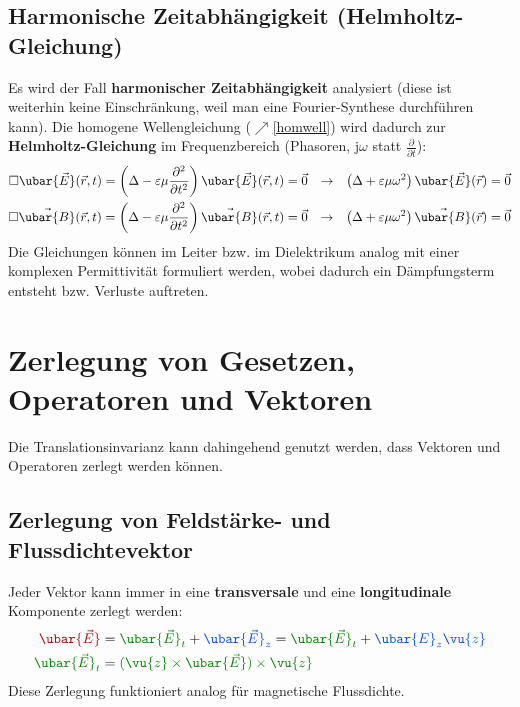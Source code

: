 \subsection{Harmonische Zeitabhängigkeit (Helmholtz-Gleichung)}
Es wird der Fall \textbf{harmonischer Zeitabhängigkeit} analysiert (diese ist weiterhin keine Einschränkung, weil man eine Fourier-Synthese durchführen kann). Die homogene Wellengleichung ($\nearrow$\ref{homwell}) wird dadurch zur \textbf{Helmholtz-Gleichung} im Frequenzbereich (Phasoren, \(\mathrm{j}\omega\) statt $\frac{\partial}{\partial t}$):
	\begin{align}
		\square \ubar{\vec{E}}(\vec{r} , t) = \left(\Delta - \varepsilon\mu\frac{\partial^2}{\partial t^2}\right) \ubar{\vec{E}} (\vec{r} , t) = \vec{0} &  & \rightarrow &  & \left(\Delta + \varepsilon\mu\omega^2\right) \ubar{\vec{E}}(\vec{r} ) =\vec{0} \label{helmholtze} \\
		\square \vec{\ubar{B}}(\vec{r} , t) = \left(\Delta - \varepsilon\mu\frac{\partial^2}{\partial t^2}\right) \vec{\ubar{B}} (\vec{r} , t) = \vec{0} &  & \rightarrow &  & \left(\Delta + \varepsilon\mu\omega^2\right) \vec{\ubar{B}}(\vec{r} ) =\vec{0}\label{helmholtzb}
	\end{align}
	Die Gleichungen können im Leiter bzw. im Dielektrikum analog mit einer komplexen Permittivität formuliert werden, wobei dadurch ein Dämpfungsterm entsteht bzw. Verluste auftreten.
\section{Zerlegung von Gesetzen, Operatoren und Vektoren}
Die Translationsinvarianz kann dahingehend genutzt werden, dass Vektoren und Operatoren zerlegt werden können.
\subsection{Zerlegung von Feldstärke- und Flussdichtevektor}
\begin{center}
	
\end{center}
  Jeder Vektor kann immer in eine \textbf{transversale} und eine \textbf{longitudinale} Komponente zerlegt werden:
	\begin{equation}\label{vekzerl}\begin{split}
			\textcolor{red}{\ubar{\vec{E}}} &= \textcolor{green}{\ubar{\vec{E}}_t} + \textcolor{blue}{\ubar{\vec{E}}_z} = \textcolor{green}{\ubar{\vec{E}}_t} + \textcolor{blue}{\ubar{E}_z\vu{z}} \\
			\textcolor{green}{\ubar{\vec{E}}_t} &= \textcolor{green}{(\vu{z}\times\ubar{\vec{E}})\times\vu{z}}
	\end{split}\end{equation}
 Diese Zerlegung funktioniert analog für magnetische Flussdichte.
